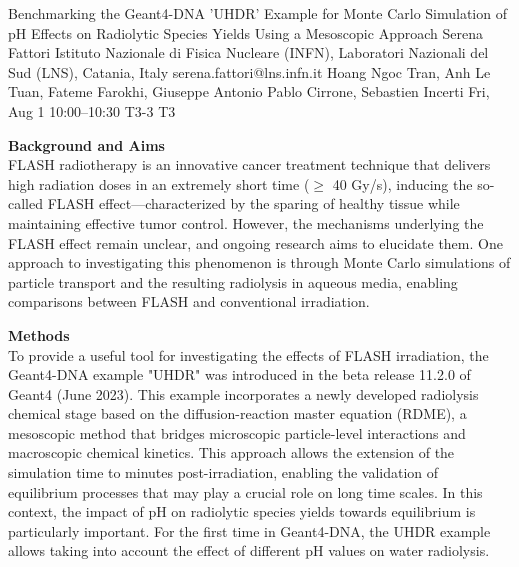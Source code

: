 \begin{talk}
\end{talk}

\begin{talk}
  {Benchmarking the Geant4-DNA 'UHDR' Example for Monte Carlo Simulation of pH Effects on Radiolytic Species Yields Using a Mesoscopic Approach}%
  {Serena Fattori}%
  {Istituto Nazionale di Fisica Nucleare (INFN), Laboratori Nazionali del Sud (LNS), Catania, Italy}%
  {serena.fattori@lns.infn.it}%
  {Hoang Ngoc Tran, Anh Le Tuan, Fateme Farokhi, Giuseppe Antonio Pablo Cirrone, Sebastien Incerti}%
  {}%
  {Fri, Aug 1 10:00--10:30}%
  {T3-3}%
  {T3}%
  
    
   
\textbf{Background and Aims}\\
FLASH radiotherapy is an innovative cancer treatment technique that delivers high radiation doses in an extremely short time ($\geq$ 40 Gy/s), inducing the so-called FLASH effect—characterized by the sparing of healthy tissue while maintaining effective tumor control. However, the mechanisms underlying the FLASH effect remain unclear, and ongoing research aims to elucidate them. One approach to investigating this phenomenon is through Monte Carlo simulations of particle transport and the resulting radiolysis in aqueous media, enabling comparisons between FLASH and conventional irradiation.

\textbf{Methods}\\
To provide a useful tool for investigating the effects of FLASH irradiation, the Geant4-DNA example "UHDR" was introduced in the beta release 11.2.0 of Geant4 (June 2023). This example incorporates a newly developed radiolysis chemical stage based on the diffusion-reaction master equation (RDME), a mesoscopic method that bridges microscopic particle-level interactions and macroscopic chemical kinetics. This approach allows the extension of the simulation time to minutes post-irradiation, enabling the validation of equilibrium processes that may play a crucial role on long time scales. In this context, the impact of pH on radiolytic species yields towards equilibrium is particularly important. For the first time in Geant4-DNA, the UHDR example allows taking into account the effect of different pH values on water radiolysis.


\end{talk}
